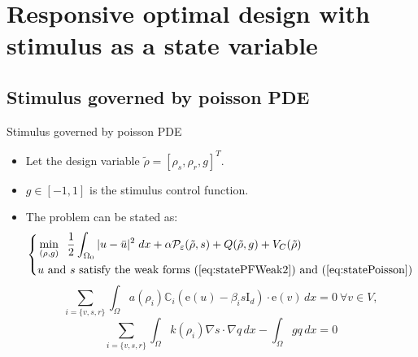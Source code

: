 \documentclass{beamer}
\newcommand{\PP}{\mathcal{P}}
\newcommand{\ee}{\mathrm{e}}
\newcommand{\p}{\rho}
\newcommand{\tp}{\tilde{\rho}}
\newcommand{\e}{\varepsilon}
\newcommand{\OO}{\Omega}
\begin{document}
\section{Responsive optimal design with stimulus as a state variable}
\subsection{Stimulus governed by poisson PDE}
\begin{frame}{Stimulus governed by poisson PDE}
    \begin{itemize}
        \item Let the design variable $\tp=[\p_s,\p_r,g]^T.$
        \item $g \in [-1,1]$ is the stimulus control function.
        \item The problem can be stated as:
            \begin{equation*}
                \begin{dcases}
                \begin{aligned}
                    &\min_{(\p,g)}\;\; \frac{1}{2}\int_{\OO_0}|u-\bar{u}|^2\;dx + \alpha\PP_{\e}(\tp,s) + Q(\tp,g) + V_C(\tp)\\
                    &u \text{ and }s\text{ satisfy the weak forms }(\ref{eq:statePFWeak2})\text{ and }(\ref{eq:statePoisson})
                \end{aligned}
                \end{dcases}
            \end{equation*}
            \begin{equation}
                \label{eq:statePFWeak2}
                \sum_{i=\{v,s,r\}}\int_\OO a(\p_i)\mathbb{C}_i\left(\ee(u)-\beta_i s\mathrm{I}_d\right)\cdot \ee(v)\, dx = 0\ \forall v \in V,
            \end{equation}
            \begin{equation}\label{eq:statePoisson}
                \sum_{i=\{v,s,r\}}\int_\OO k(\p_i)\nabla s \cdot \nabla q\,dx - \int_{\OO}gq\,dx = 0
            \end{equation}
    \end{itemize}
\end{frame}
\end{document}
